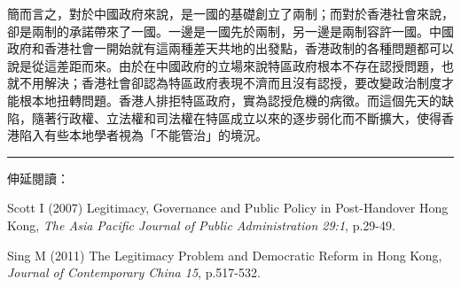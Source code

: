 簡而言之，對於中國政府來說，是一國的基礎創立了兩制；而對於香港社會來說，卻是兩制的承諾帶來了一國。一邊是一國先於兩制，另一邊是兩制容許一國。中國政府和香港社會一開始就有這兩種差天共地的出發點，香港政制的各種問題都可以說是從這差距而來。由於在中國政府的立場來說特區政府根本不存在認授問題，也就不用解決；香港社會卻認為特區政府表現不濟而且沒有認授，要改變政治制度才能根本地扭轉問題。香港人排拒特區政府，實為認授危機的病徵。而這個先天的缺陷，隨著行政權、立法權和司法權在特區成立以來的逐步弱化而不斷擴大，使得香港陷入有些本地學者視為「不能管治」的境況。

\rule[-10pt]{15cm}{0.05em}

伸延閱讀：

Scott I (2007) Legitimacy, Governance and Public Policy in Post-Handover Hong Kong, \textit{The Asia Pacific Journal of Public Administration 29:1}, p.29-49.

Sing M (2011) The Legitimacy Problem and Democratic Reform in Hong Kong, \textit{Journal of Contemporary China 15}, p.517-532.